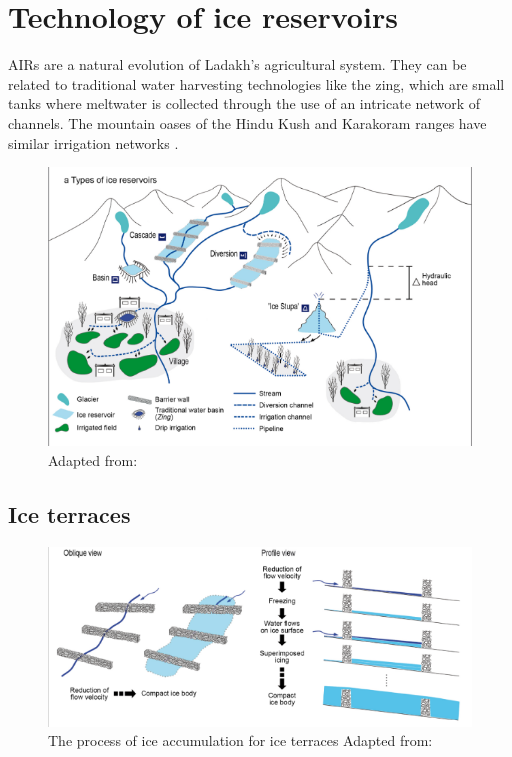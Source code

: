 \chapter{Technology of ice reservoirs}

AIRs are a natural evolution of Ladakh's agricultural system. They can be related to traditional water
harvesting technologies like the {zing}, which are small tanks where meltwater is collected through the use
of an intricate network of channels. The mountain oases of the Hindu Kush and Karakoram ranges
have similar irrigation networks \citep{nusserLocalKnowledgeGlobal2016}.

\begin{figure}[t]
\centering
\includegraphics[width=12cm]{figs/AIR_designs.png}

\caption{Adapted from: \cite{nusserSociohydrologyArtificialGlaciers2019}}

\label{fig:AIRdesigns}
\end{figure}

\section{Ice terraces}


\begin{figure}[t]
\centering
\includegraphics[width=12cm]{figs/IT_science.png}

\caption{ The process of ice accumulation for ice terraces Adapted from:
\cite{nusserSociohydrologyArtificialGlaciers2019}}

\label{fig:ITscience}
\end{figure}

